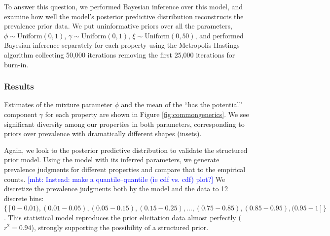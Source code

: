 \documentclass[12pt,letterpaper]{article}
\newcommand{\ndg}[1]{\textcolor{Green}{[ndg: #1]}}
\newcommand{\mht}[1]{\textcolor{Blue}{[mht: #1]}}
\begin{document}
To answer this question, we performed Bayesian inference over this model, and examine how well the model's posterior predictive distribution reconstructs the prevalence prior data.
We put uninformative priors over all the parameters, $\phi \sim \text{Uniform}(0,1)$, 
$\gamma \sim \text{Uniform}(0,1)$, $\xi \sim \text{Uniform}(0, 50)$, 
and performed Bayesian inference separately for each property using the Metropolis-Hastings algorithm 
collecting 50,000 iterations removing the first 25,000 iterations for burn-in.

\subsubsection*{Results}


Estimates of the mixture parameter $\phi$ and the mean of the ``has the potential'' component $\gamma$ for each property are shown in Figure \ref{fig:commongenerics}.
We see significant diversity among our properties in both parameters, corresponding to priors over prevalence with dramatically different shapes (insets). 

Again, we look to the posterior predictive distribution to validate the structured prior model.
Using the model with its inferred parameters, we generate prevalence judgments for different properties and compare that to the empirical counts. 
\mht{Instead: make a quantile--quantile (ie cdf vs. cdf) plot?}
We discretize the prevalence judgments both by the model and the data to 12 discrete bins: $\{[0-0.01), (0.01-0.05), (0.05-0.15), (0.15-0.25),  ..., (0.75-0.85), (0.85-0.95), (0.95-1]\}$.
This statistical model reproduces the prior elicitation data almost perfectly ($r^2 = 0.94$), strongly supporting the possibility of a structured prior. 
\end{document}
